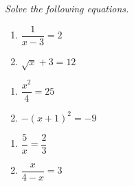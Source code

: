 \documentclass[10pt]{article}
\begin{document}
\noindent
\textit{Solve the following equations.} 
\begin{multicols}{2}
\begin{enumerate}
\setcounter{enumi}{\theenumCount}
\item $\dfrac{1}{x-3} = 2$ 

\item $\sqrt{x} + 3 = 12$ 
\setcounter{enumCount}{\theenumi}
\end{enumerate}
\end{multicols}
\vfill

\begin{multicols}{2}
\begin{enumerate}
\setcounter{enumi}{\theenumCount}
\item $\dfrac{x^2}{4} = 25$ 

\item $-(x+1)^2 = -9$ 
\setcounter{enumCount}{\theenumi}
\end{enumerate}
\end{multicols}
\vfill


\begin{multicols}{2}
\begin{enumerate}
\setcounter{enumi}{\theenumCount}
\item $\dfrac{5}{x} = \dfrac{2}{3}$ 

\item $\dfrac{x}{4-x} = 3$ 
\setcounter{enumCount}{\theenumi}
\end{enumerate}
\end{multicols}
\vfill
\end{document}
